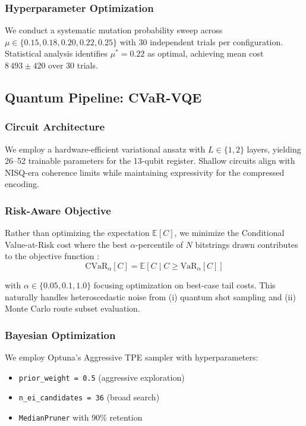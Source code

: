 \subsubsection{Hyperparameter Optimization}
We conduct a systematic mutation probability sweep across $\mu \in \{0.15, 0.18, 0.20, 0.22, 0.25\}$ with 30 independent trials per configuration.
Statistical analysis identifies $\mu^* = 0.22$ as optimal, achieving mean cost $8\,493 \pm 420$ over 30 trials.


\subsection{Quantum Pipeline: CVaR-VQE}

\subsubsection{Circuit Architecture}
We employ a hardware-efficient variational ansatz with $L \in \{1, 2\}$ layers, yielding 26--52 trainable parameters for the 13-qubit register.
Shallow circuits align with NISQ-era coherence limits while maintaining expressivity for the compressed encoding.

\subsubsection{Risk-Aware Objective}
Rather than optimizing the expectation $\mathbb{E}[C]$, we minimize the Conditional Value-at-Risk cost where the best $\alpha$-percentile of $N$ bitstrings drawn contributes to the objective function \cite{barkoutsos_improving_2020}:
\begin{equation}
    \text{CVaR}_\alpha[C] = \mathbb{E}[C \mid C \geq \text{VaR}_\alpha[C]]
\end{equation}


with $\alpha \in \{0.05, 0.1, 1.0\}$ focusing optimization on best-case tail costs.
This naturally handles heteroscedastic noise from (i) quantum shot sampling and (ii) Monte Carlo route subset evaluation.

\subsubsection{Bayesian Optimization}
We employ Optuna's Aggressive TPE sampler with hyperparameters:
\begin{itemize}
    \item \texttt{prior\_weight = 0.5} (aggressive exploration)
    \item \texttt{n\_ei\_candidates = 36} (broad search)  
    \item \texttt{MedianPruner} with 90\% retention
\end{itemize}

